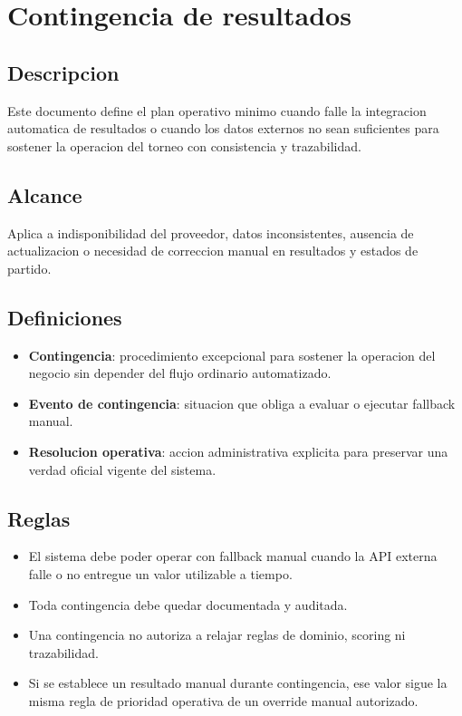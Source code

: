 \section{Contingencia de resultados}

\subsection{Descripcion}

Este documento define el plan operativo minimo cuando falle la integracion automatica de resultados o cuando los datos externos no sean suficientes para sostener la operacion del torneo con consistencia y trazabilidad.

\subsection{Alcance}

Aplica a indisponibilidad del proveedor, datos inconsistentes, ausencia de actualizacion o necesidad de correccion manual en resultados y estados de partido.

\subsection{Definiciones}

\begin{itemize}
  \item \textbf{Contingencia}: procedimiento excepcional para sostener la operacion del negocio sin depender del flujo ordinario automatizado.
  \item \textbf{Evento de contingencia}: situacion que obliga a evaluar o ejecutar fallback manual.
  \item \textbf{Resolucion operativa}: accion administrativa explicita para preservar una verdad oficial vigente del sistema.
\end{itemize}

\subsection{Reglas}

\begin{itemize}
  \item El sistema debe poder operar con fallback manual cuando la API externa falle o no entregue un valor utilizable a tiempo.
  \item Toda contingencia debe quedar documentada y auditada.
  \item Una contingencia no autoriza a relajar reglas de dominio, scoring ni trazabilidad.
  \item Si se establece un resultado manual durante contingencia, ese valor sigue la misma regla de prioridad operativa de un override manual autorizado.
\end{itemize}

